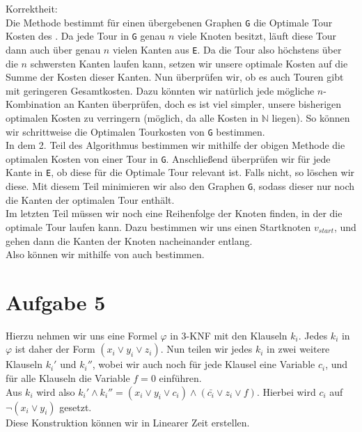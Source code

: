 \documentclass[a4paper,11pt]{scrartcl}
\renewcommand{\phi}{\varphi}
\begin{document}
	Korrektheit:\\
	Die Methode bestimmt für einen übergebenen Graphen \verb|G| die Optimale Tour Kosten des . Da jede Tour in \verb|G| genau $n$ viele Knoten besitzt, läuft diese Tour dann auch über genau $n$ vielen Kanten aus \verb|E|. Da die Tour also höchstens über die $n$ schwersten Kanten laufen kann, setzen wir unsere optimale Kosten auf die Summe der Kosten dieser Kanten. Nun überprüfen wir, ob es auch Touren gibt mit geringeren Gesamtkosten. Dazu könnten wir natürlich jede mögliche $n$-Kombination an Kanten überprüfen, doch es ist viel simpler, unsere bisherigen optimalen Kosten zu verringern (möglich, da alle Kosten in $\mathbb{N}$ liegen). So können wir schrittweise die Optimalen Tourkosten von \verb|G| bestimmen.\\
	In dem 2. Teil des Algorithmus bestimmen wir mithilfe der obigen Methode die optimalen Kosten von einer Tour in \verb|G|. Anschließend überprüfen wir für jede Kante in \verb|E|, ob diese für die Optimale Tour relevant ist. Falls nicht, so löschen wir diese. Mit diesem Teil minimieren wir also den Graphen \verb|G|, sodass dieser nur noch die Kanten der optimalen Tour enthält.\\
	Im letzten Teil müssen wir noch eine Reihenfolge der Knoten finden, in der die optimale Tour laufen kann. Dazu bestimmen wir uns einen Startknoten $v_{start}$, und gehen dann die Kanten der Knoten nacheinander entlang.\\
	Also können wir mithilfe von  auch  bestimmen.
	\section*{Aufgabe 5}
	Hierzu nehmen wir uns eine Formel $\phi$ in 3-KNF mit den Klauseln $k_i$.
	Jedes $k_i$ in $\phi$ ist daher der Form $(x_i \lor y_i \lor z_i)$. Nun teilen wir jedes $k_i$ in zwei weitere Klauseln $k_i'$ und $k_i''$, wobei wir auch noch für jede Klausel eine Variable $c_i$, und für alle Klauseln die Variable $f = 0$ einführen.\\
	Aus $k_i$ wird also $k_i' \land k_i'' = (x_i \lor y_i \lor c_i) \land (\bar{c_i} \lor z_i \lor f)$.
	Hierbei wird $c_i$ auf $\neg (x_i \lor y_i)$ gesetzt.\\
	Diese Konstruktion können wir in Linearer Zeit erstellen.\\
	
\end{document}

